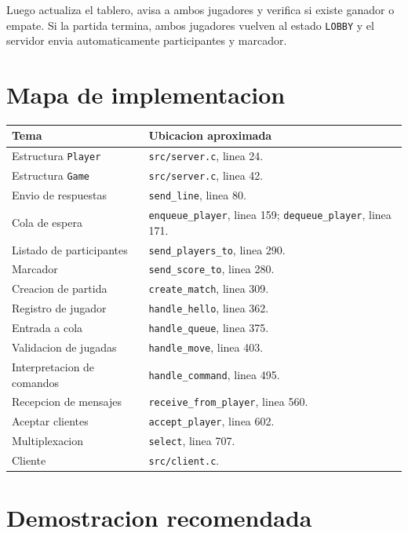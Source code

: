 \documentclass[12pt,a4paper]{article}
\begin{document}
Luego actualiza el tablero, avisa a ambos jugadores y verifica si existe ganador
o empate. Si la partida termina, ambos jugadores vuelven al estado \texttt{LOBBY}
y el servidor envia automaticamente participantes y marcador.

\section{Mapa de implementacion}

\begin{longtable}{|p{6cm}|p{8cm}|}
\hline
\textbf{Tema} & \textbf{Ubicacion aproximada} \\
\hline
Estructura \texttt{Player} & \texttt{src/server.c}, linea 24. \\
\hline
Estructura \texttt{Game} & \texttt{src/server.c}, linea 42. \\
\hline
Envio de respuestas & \texttt{send\_line}, linea 80. \\
\hline
Cola de espera & \texttt{enqueue\_player}, linea 159; \texttt{dequeue\_player}, linea 171. \\
\hline
Listado de participantes & \texttt{send\_players\_to}, linea 290. \\
\hline
Marcador & \texttt{send\_score\_to}, linea 280. \\
\hline
Creacion de partida & \texttt{create\_match}, linea 309. \\
\hline
Registro de jugador & \texttt{handle\_hello}, linea 362. \\
\hline
Entrada a cola & \texttt{handle\_queue}, linea 375. \\
\hline
Validacion de jugadas & \texttt{handle\_move}, linea 403. \\
\hline
Interpretacion de comandos & \texttt{handle\_command}, linea 495. \\
\hline
Recepcion de mensajes & \texttt{receive\_from\_player}, linea 560. \\
\hline
Aceptar clientes & \texttt{accept\_player}, linea 602. \\
\hline
Multiplexacion & \texttt{select}, linea 707. \\
\hline
Cliente & \texttt{src/client.c}. \\
\hline
\end{longtable}

\section{Demostracion recomendada}
\end{document}
